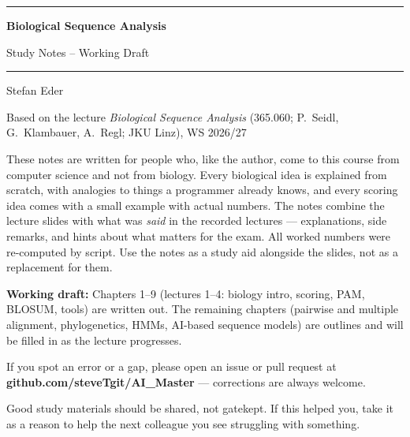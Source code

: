 \documentclass[11pt, oneside]{book}
\newcommand{\coursetitle}{Biological Sequence Analysis}
\newcommand{\documenttype}{Study Notes -- Working Draft}
\newcommand{\authorname}{Stefan Eder}
\newcommand{\basedon}{Based on the lecture \emph{Biological Sequence Analysis} (365.060; P.~Seidl, G.~Klambauer, A.~Regl; JKU Linz), WS 2026/27}
\begin{document}
\frontmatter  %


\thispagestyle{empty}
\vspace*{1.8cm}

\begin{center}
  {\color{accent}\rule{\linewidth}{1.8pt}}
  \vspace{0.65cm}

  {\fontsize{28}{34}\selectfont\bfseries\color{accent}\coursetitle\par}
  \vspace{0.25cm}
  {\large\color{gray!80!black}\documenttype\par}

  \vspace{0.55cm}
  {\color{accent!35}\rule{\linewidth}{0.5pt}}
  \vspace{0.55cm}

  {\large\authorname\par}
  \vspace{0.2cm}
  {\small\color{gray!70}\basedon\par}
\end{center}

\vspace{1.6cm}

\begin{center}
\begin{minipage}{0.84\textwidth}
  \small\color{gray!80!black}
  These notes are written for people who, like the author, come to this
  course from computer science and not from biology. Every biological idea is
  explained from scratch, with analogies to things a programmer already
  knows, and every scoring idea comes with a small example with actual
  numbers. The notes combine the lecture slides with what was \emph{said} in
  the recorded lectures --- explanations, side remarks, and hints about what
  matters for the exam. All worked numbers were re-computed by script.
  Use the notes as a study aid alongside the slides, not as a replacement for
  them.

  \medskip
  \textbf{Working draft:} Chapters 1--9 (lectures 1--4: biology intro,
  scoring, PAM, BLOSUM, tools) are written out. The remaining chapters
  (pairwise and multiple alignment, phylogenetics, HMMs, AI-based sequence
  models) are outlines and will be filled in as the lecture progresses.

  \medskip
  If you spot an error or a gap, please open an issue or pull request at
  \textbf{github.com/steveTgit/AI\_Master} --- corrections are always welcome.

  \medskip
  \color{gray!60!black}
  Good study materials should be shared, not gatekept.
  If this helped you, take it as a reason to help the next colleague you see struggling with something.
\end{minipage}
\end{center}
\end{document}
